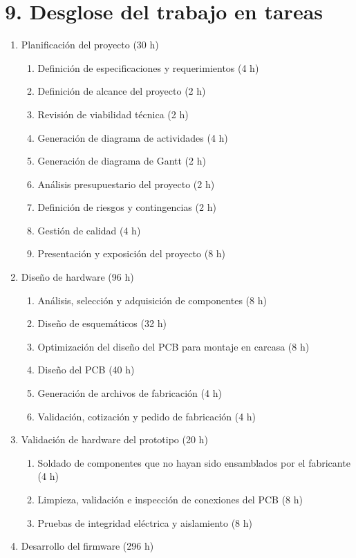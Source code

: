 \documentclass[
11pt, %
]{charter}
\begin{document}
\section{9. Desglose del trabajo en tareas}
\label{sec:wbs}

\begin{enumerate}
\item Planificación del proyecto (30 h)
	\begin{enumerate}
	\item Definición de especificaciones y requerimientos (4 h)
	\item Definición de alcance del proyecto (2 h)
	\item Revisión de viabilidad técnica (2 h)
	\item Generación de diagrama de actividades (4 h)
	\item Generación de diagrama de Gantt (2 h)
	\item Análisis presupuestario del proyecto (2 h)
	\item Definición de riesgos y contingencias  (2 h)
	\item Gestión de calidad (4 h)
	\item Presentación y exposición del proyecto (8 h)
	\end{enumerate}
\item Diseño de hardware (96 h)
	\begin{enumerate}
	\item Análisis, selección y adquisición de componentes (8 h)
	\item Diseño de esquemáticos (32 h)
	\item Optimización del diseño del PCB para montaje en carcasa (8 h)
	\item Diseño del PCB (40 h)
	\item Generación de archivos de fabricación (4 h)
	\item Validación, cotización y pedido de fabricación (4 h)
	\end{enumerate}
\item Validación de hardware del prototipo (20 h)
	\begin{enumerate}
	\item Soldado de componentes que no hayan sido ensamblados por el fabricante (4 h)
	\item Limpieza, validación e inspección de conexiones del PCB (8 h)
	\item Pruebas de integridad eléctrica y aislamiento (8 h)
	\end{enumerate}
\item Desarrollo del firmware (296 h)

\end{enumerate}
\end{document}
